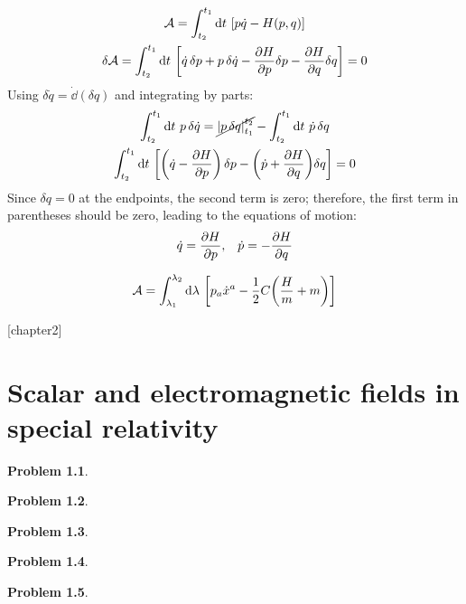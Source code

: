 \documentclass{report}
\theoremstyle{definition}
\begin{document}
\begin{chapter1}\label{prob:9}
	\begin{gather*}
		\mathcal A = \int_{t_2}^{t_1}\dd{t}\,\bqty{p\dot q - H(p,q)} \\
		\delta\mathcal A = \int_{t_2}^{t_1} \dd{t}\, \bqty{\dot q\,\delta p + p\,\delta\dot q  - \pdv{H}{p}\delta p - \pdv{H}{q}\delta q} = 0
	\end{gather*}
	Using $\delta\dot q = \dot\dd(\delta q)$ and integrating by parts:
	\begin{gather*}
		\int_{t_2}^{t_1} \dd{t}\, p\,\delta \dot q = \cancel{\left|p\,\delta q\right|_{t_1}^{t_2}} - \int_{t_2}^{t_1} \dd{t}\,\dot p\, \delta q  \\
		\int_{t_2}^{t_1} \dd{t}\, \bqty{\pqty{\dot q -\pdv{H}{p}}\,\delta p - \pqty{\dot p + \pdv{H}{q}}\delta q} = 0
	\end{gather*}
	Since $\delta q = 0 $ at the endpoints, the second term is zero; therefore, the first term in parentheses should be zero, leading to the equations of motion:
	\begin{gather*}
		\dot q = \pdv{H}{p},\;\;\;\dot p = -\pdv{H}{q} 	
	\end{gather*} 
\end{chapter1}

\begin{chapter1}\label{prob:10}
	\begin{gather*}
		\mathcal A = \int_{\lambda_1}^{\lambda_2} \dd{\lambda}\, \bqty{p_a \dot x^a - \frac{1}{2}C\pqty{\frac{H}{m} + m}}		
	\end{gather*}

\end{chapter1}

\begin{chapter1}\label{prob:11}

\end{chapter1}

\newtheorem{chapter2}{Problem}
[chapter2]

\chapter{Scalar and electromagnetic fields in special relativity}
\begin{chapter2}\label{prob:1}
	
\end{chapter2}

\begin{chapter2}\label{prob:2}
	
\end{chapter2}

\begin{chapter2}\label{prob:3}
	
\end{chapter2}

\begin{chapter2}\label{prob:4}
	
\end{chapter2}

\begin{chapter2}\label{prob:5}
	
\end{chapter2}
\end{document}
